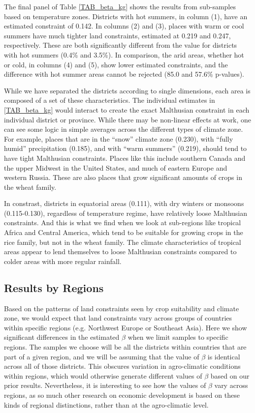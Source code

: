\documentclass[11pt]{article}
\begin{document}
The final panel of Table \ref{TAB_beta_kg} shows the results from sub-samples based on temperature zones. Districts with hot summers, in column (1), have an estimated constraint of 0.142. In columns (2) and (3), places with warm or cool summers have much tighter land constraints, estimated at 0.219 and 0.247, respectively. These are both significantly different from the value for districts with hot summers (0.4\% and 3.5\%). In comparison, the arid areas, whether hot or cold, in columns (4) and (5), show lower estimated constraints, and the difference with hot summer areas cannot be rejected (85.0 and 57.6\% p-values).

While we have separated the districts according to single dimensions, each area is composed of a set of these characteristics. The individual estimates in \ref{TAB_beta_kg} would interact to create the exact Malthusian constraint in each individual district or province. While there may be non-linear effects at work, one can see some logic in simple averages across the different types of climate zone. For example, places that are in the ``snow'' climate zone (0.230), with ``fully humid'' precipitation (0.185), and with ``warm summers'' (0.219), should tend to have tight Malthusian constraints. Places like this include southern Canada and the upper Midwest in the United States, and much of eastern Europe and western Russia. These are also places that grow significant amounts of crops in the wheat family. 

In constrast, districts in equatorial areas (0.111), with dry winters or monsoons (0.115-0.130), regardless of temperature regime, have relatively loose Malthusian constraints. And this is what we find when we look at sub-regions like tropical Africa and Central America, which tend to be suitable for growing crops in the rice family, but not in the wheat family. The climate characteristics of tropical areas appear to lend themselves to loose Malthusian constraints compared to colder areas with more regular rainfall. 

\subsection{Results by Regions}
Based on the patterns of land constraints seen by crop suitability and climate zone, we would expect that land constraints vary across groups of countries within specific regions (e.g. Northwest Europe or Southeast Asia). Here we show significant differences in the estimated $\beta$ when we limit samples to specific regions. The samples we choose will be all the districts within countries that are part of a given region, and we will be assuming that the value of $\beta$ is identical across all of those districts. This obscures variation in agro-climatic conditions within regions, which would otherwise generate different values of $\beta$ based on our prior results. Nevertheless, it is interesting to see how the values of $\beta$ vary across regions, as so much other research on economic development is based on these kinds of regional distinctions, rather than at the agro-climatic level.
\end{document}
